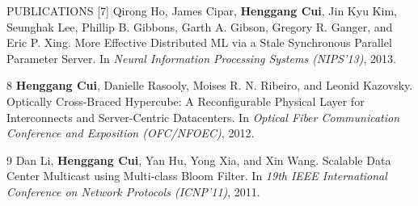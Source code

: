 \documentclass{resume} %
\begin{document}
\begin{rSection}{PUBLICATIONS}
    [7]
        Qirong Ho, James Cipar, {\bf Henggang Cui}, Jin Kyu Kim, Seunghak Lee,
        Phillip B. Gibbons, Garth A. Gibson, Gregory R. Ganger, and Eric P. Xing.
        More Effective Distributed ML via a Stale Synchronous Parallel Parameter Server.
        In \emph{Neural Information Processing Systems (NIPS'13)},
        2013.
    \item
    [8]
        {\bf Henggang Cui}, Danielle Rasooly, Moises R. N. Ribeiro, and Leonid Kazovsky.
        Optically Cross-Braced Hypercube: A Reconfigurable Physical Layer for
        Interconnects and Server-Centric Datacenters.
        In \emph{Optical Fiber Communication Conference and Exposition (OFC/NFOEC)},
        2012.
    \item
    [9]
        Dan Li, {\bf Henggang Cui}, Yan Hu, Yong Xia, and Xin Wang.
        Scalable Data Center Multicast using Multi-class Bloom Filter.
        In \emph{19th IEEE International Conference on Network Protocols (ICNP'11)},
        2011.
\end{rSection}
\vspace{-.05in}

\end{document}

